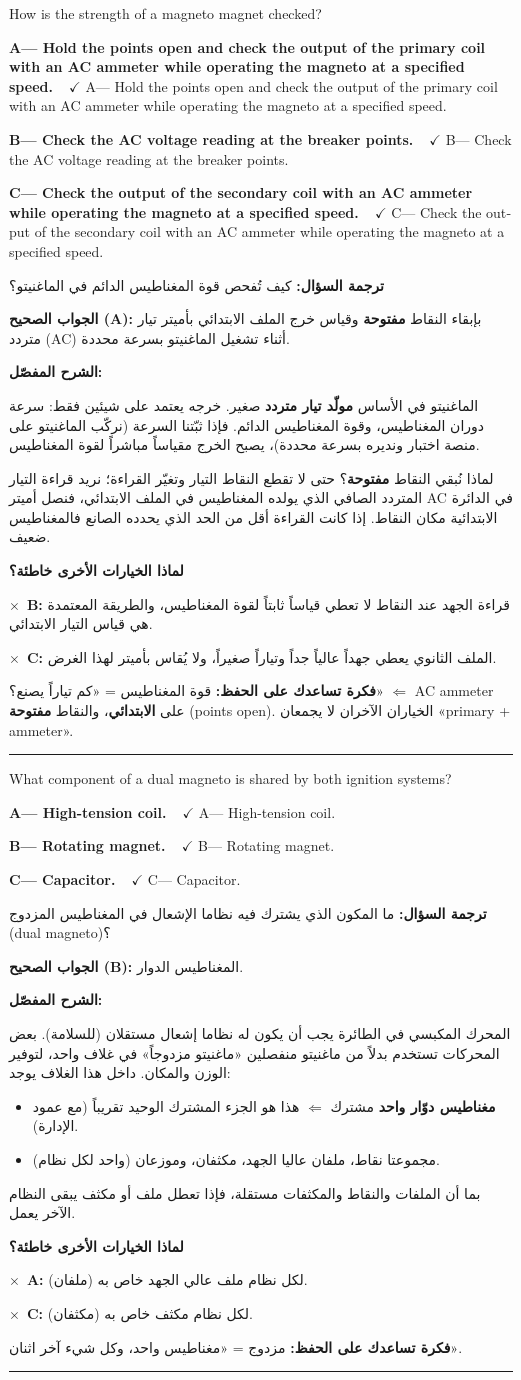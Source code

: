 \documentclass[11pt,a4paper]{article}
\newcommand{\en}[1]{\textenglish{#1}}
\newcommand{\correctletter}{}
\newcommand{\opt}[2]{%
  \ifdefstring{\correctletter}{#1}%
    {\textcolor{ansgreen}{\textbf{#1— #2\ \ $\checkmark$}}}%
    {#1— #2}\par}
\newcommand{\Q}[6]{%
  \renewcommand{\correctletter}{#6}%
  \par\bigskip
  \phantomsection\label{q#1}%
  \begin{tcolorbox}[enhanced,breakable,colback=qback,colframe=qframe,
      arc=2mm,boxrule=0.8pt,fonttitle=\bfseries,
      title={\en{Question #1}}]
    \begin{english}
      #2\par\smallskip
      \opt{A}{#3}\opt{B}{#4}\opt{C}{#5}
    \end{english}
  \end{tcolorbox}}
\newcommand{\tr}[1]{\textbf{\textcolor{qframe}{ترجمة السؤال:}} #1\par}
\newcommand{\ans}[2]{%
  \begin{tcolorbox}[colback=ansback,colframe=ansgreen,boxrule=0.6pt,arc=1.5mm,
      left=4pt,right=4pt,top=2pt,bottom=2pt]
    \textbf{\textcolor{ansgreen}{الجواب الصحيح (\en{#1}):}} #2
  \end{tcolorbox}}
\newcommand{\sharh}[1]{\textbf{\textcolor{conceptc}{الشرح المفصّل:}}\par #1\par}
\newcommand{\nohead}{\textbf{\textcolor{wrongc}{لماذا الخيارات الأخرى خاطئة؟}}\par}
\newcommand{\no}[2]{\hspace*{1em}\textcolor{wrongc}{$\times$}\ \textbf{\en{#1}:} #2\par}
\newcommand{\tip}[1]{%
  \begin{tcolorbox}[colback=tipback,colframe=tipframe,boxrule=0.5pt,arc=1.5mm,
      left=4pt,right=4pt,top=2pt,bottom=2pt]
    \textbf{فكرة تساعدك على الحفظ:} #1
  \end{tcolorbox}}
\newcommand{\qsep}{\par\medskip\noindent\textcolor{qframe!40}{\rule{\linewidth}{0.4pt}}\par}
\begin{document}
\Q{8504}{How is the strength of a magneto magnet checked?}
{Hold the points open and check the output of the primary coil with an AC ammeter while operating the magneto at a specified speed.}
{Check the AC voltage reading at the breaker points.}
{Check the output of the secondary coil with an AC ammeter while operating the magneto at a specified speed.}{A}
\tr{كيف تُفحص قوة المغناطيس الدائم في الماغنيتو؟}
\ans{A}{بإبقاء النقاط \textbf{مفتوحة} وقياس خرج الملف الابتدائي بأميتر تيار متردد (\en{AC}) أثناء تشغيل الماغنيتو بسرعة محددة.}
\sharh{الماغنيتو في الأساس \textbf{مولّد تيار متردد} صغير. خرجه يعتمد على شيئين فقط: سرعة دوران المغناطيس، وقوة المغناطيس الدائم. فإذا ثبّتنا السرعة (نركّب الماغنيتو على منصة اختبار ونديره بسرعة محددة)، يصبح الخرج مقياساً مباشراً لقوة المغناطيس.

لماذا نُبقي النقاط \textbf{مفتوحة}؟ حتى لا تقطع النقاط التيار وتغيّر القراءة؛ نريد قراءة التيار المتردد الصافي الذي يولده المغناطيس في الملف الابتدائي، فنصل أميتر \en{AC} في الدائرة الابتدائية مكان النقاط. إذا كانت القراءة أقل من الحد الذي يحدده الصانع فالمغناطيس ضعيف.}
\nohead
\no{B}{قراءة الجهد عند النقاط لا تعطي قياساً ثابتاً لقوة المغناطيس، والطريقة المعتمدة هي قياس التيار الابتدائي.}
\no{C}{الملف الثانوي يعطي جهداً عالياً جداً وتياراً صغيراً، ولا يُقاس بأميتر لهذا الغرض.}
\tip{قوة المغناطيس = «كم تياراً يصنع؟» $\Leftarrow$ \en{AC ammeter} على \textbf{الابتدائي}، والنقاط \textbf{مفتوحة} (\en{points open}). الخياران الآخران لا يجمعان «\en{primary} + \en{ammeter}».}
\qsep

\Q{8610}{What component of a dual magneto is shared by both ignition systems?}
{High-tension coil.}
{Rotating magnet.}
{Capacitor.}{B}
\tr{ما المكون الذي يشترك فيه نظاما الإشعال في المغناطيس المزدوج (\en{dual magneto})؟}
\ans{B}{المغناطيس الدوار.}
\sharh{المحرك المكبسي في الطائرة يجب أن يكون له نظاما إشعال مستقلان (للسلامة). بعض المحركات تستخدم بدلاً من ماغنيتو منفصلين «ماغنيتو مزدوجاً» في غلاف واحد، لتوفير الوزن والمكان. داخل هذا الغلاف يوجد:
\begin{itemize}
  \item \textbf{مغناطيس دوّار واحد} مشترك $\Leftarrow$ هذا هو الجزء المشترك الوحيد تقريباً (مع عمود الإدارة).
  \item مجموعتا نقاط، ملفان عاليا الجهد، مكثفان، وموزعان (واحد لكل نظام).
\end{itemize}
بما أن الملفات والنقاط والمكثفات مستقلة، فإذا تعطل ملف أو مكثف يبقى النظام الآخر يعمل.}
\nohead
\no{A}{لكل نظام ملف عالي الجهد خاص به (ملفان).}
\no{C}{لكل نظام مكثف خاص به (مكثفان).}
\tip{مزدوج = «مغناطيس واحد، وكل شيء آخر اثنان».}
\qsep
\end{document}
